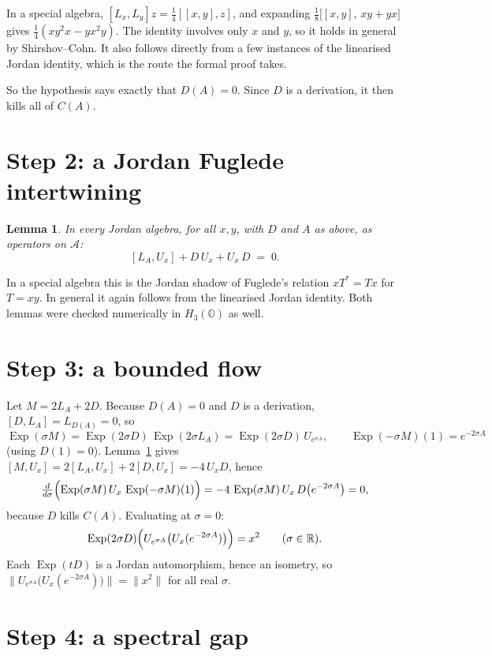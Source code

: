 \documentclass[11pt]{article}
\newtheorem{lemma}[theorem]{Lemma}
\theoremstyle{remark}
\DeclareMathOperator{\Exp}{Exp}
\begin{document}
In a special algebra, $[L_x,L_y]z = \tfrac14[[x,y],z]$, and expanding
$\tfrac18\bigl[[x,y],\,xy+yx\bigr]$ gives $\tfrac14(xy^2x - yx^2y)$.
The identity involves only $x$ and $y$, so it holds in general by
Shirshov--Cohn. It also follows directly from a few instances of the linearised
Jordan identity, which is the route the formal proof takes.

So the hypothesis says exactly that $D(A) = 0$.
Since $D$ is a derivation, it then kills all of $C(A)$.

\section*{Step 2: a Jordan Fuglede intertwining}

\begin{lemma}\label{lem:jk}
In every Jordan algebra, for all $x,y$, with $D$ and $A$ as above, as
operators on $\mathcal A$:
\[
  [L_A, U_x] + D\,U_x + U_x\,D \;=\; 0 .
\]
\end{lemma}

In a special algebra this is the Jordan shadow of Fuglede's relation
$xT^* = Tx$ for $T = xy$. In general it again follows from the linearised
Jordan identity. Both lemmas were checked numerically in
$H_3(\mathbb O)$ as well.

\section*{Step 3: a bounded flow}

Let $M = 2L_A + 2D$.
Because $D(A)=0$ and $D$ is a derivation, $[D,L_A] = L_{D(A)} = 0$, so
\[
  \Exp(\sigma M) = \Exp(2\sigma D)\,\Exp(2\sigma L_A)
  = \Exp(2\sigma D)\, U_{e^{\sigma A}},
  \qquad
  \Exp(-\sigma M)(1) = e^{-2\sigma A}
\]
(using $D(1)=0$). Lemma~\ref{lem:jk} gives
$[M,U_x] = 2[L_A,U_x] + 2[D,U_x] = -4\,U_x D$, hence
\[
  \tfrac{d}{d\sigma}\Bigl(\Exp(\sigma M)\,U_x\,\Exp(-\sigma M)(1)\Bigr)
  = -4\,\Exp(\sigma M)\,U_x\,D\bigl(e^{-2\sigma A}\bigr) = 0,
\]
because $D$ kills $C(A)$. Evaluating at $\sigma = 0$:
\begin{equation}\label{eq:flow}
  \Exp(2\sigma D)\Bigl(U_{e^{\sigma A}}\bigl(U_x(e^{-2\sigma A})\bigr)\Bigr) = x^2
  \qquad(\sigma\in\mathbb R).
\end{equation}
Each $\Exp(tD)$ is a Jordan automorphism, hence an isometry, so
$\bigl\|U_{e^{\sigma A}}\bigl(U_x(e^{-2\sigma A})\bigr)\bigr\| = \|x^2\|$ for all
real $\sigma$.

\section*{Step 4: a spectral gap}
\end{document}
